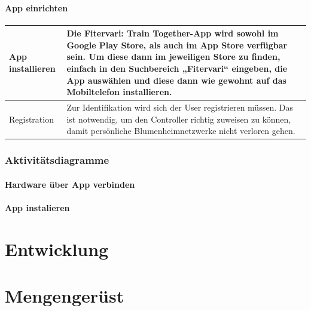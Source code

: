 \documentclass[12pt]{article}
\theoremstyle{definition}
\begin{document}
\newpage

\paragraph{App einrichten}
\begin{center}

\end{center}
\begin{center}
\begin{tabular}{| L{3cm} | C{12cm} |}
\hline
App installieren & Die Fitervari: Train Together-App wird sowohl im Google Play Store, als auch im App Store verfügbar sein. Um diese dann im jeweiligen Store zu finden, einfach in den Suchbereich „Fitervari“ eingeben, die App auswählen und diese dann wie gewohnt auf das Mobiltelefon installieren.\\

\hline
Registration & Zur Identifikation wird sich der User registrieren müssen. Das ist notwendig, um den Controller richtig zuweisen zu können, damit persönliche Blumenheimnetzwerke nicht verloren gehen.\\


\hline
\end{tabular}
\end{center}

\pagebreak
\subsubsection{Aktivitätsdiagramme}
\paragraph{Hardware über App verbinden}
\begin{center}

\end{center}

\paragraph{App instalieren}
\begin{center}

\end{center}

\pagebreak
\section{Entwicklung}


\section{Mengengerüst}
\end{document}

